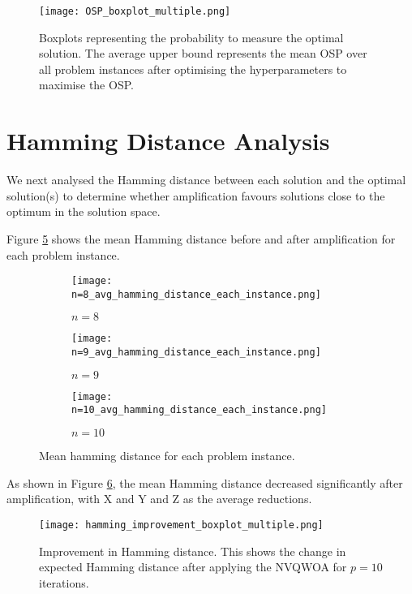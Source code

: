 \begin{figure}[htbp]
    \centering
    \texttt{[image: OSP\_boxplot\_multiple.png]} 
    \caption{Boxplots representing the probability to measure the optimal solution. The average upper bound represents the mean OSP over all problem instances after optimising the hyperparameters to maximise the OSP.}
    \label{fig:osp}
\end{figure}



\section{Hamming Distance Analysis}
We next analysed the Hamming distance between each solution and the optimal solution(s) to determine whether amplification favours solutions close to the optimum in the solution space.

Figure \ref{fig:avg ham} shows the mean Hamming distance before and after amplification for each problem instance.
\begin{figure}[htbp]
     \centering
     \begin{subfigure}{0.45\textwidth}
         \centering
         \texttt{[image: n=8\_avg\_hamming\_distance\_each\_instance.png]}
         \caption{$n=8$}
         \label{fig:avg ham 8}
     \end{subfigure}
     \hfill
     \begin{subfigure}{0.45\textwidth}
         \centering
         \texttt{[image: n=9\_avg\_hamming\_distance\_each\_instance.png]}
         \caption{$n=9$}
         \label{fig:avg ham 9}
     \end{subfigure}
     \hfill
     \begin{subfigure}{\textwidth}
         \centering
         \texttt{[image: n=10\_avg\_hamming\_distance\_each\_instance.png]}
         \caption{$n=10$}
         \label{fig:avg ham 10}
     \end{subfigure}
        \caption{Mean hamming distance for each problem instance.}
        \label{fig:avg ham}
\end{figure}

As shown in Figure \ref{fig:ham improvement}, the mean Hamming distance decreased significantly after amplification, with X and Y and Z as the average reductions.
\begin{figure}[htbp]
    \centering
    \texttt{[image: hamming\_improvement\_boxplot\_multiple.png]}
    \caption{Improvement in Hamming distance. This shows the change in expected Hamming distance after applying the NVQWOA for $p=10$ iterations.}
    \label{fig:ham improvement}
\end{figure}

